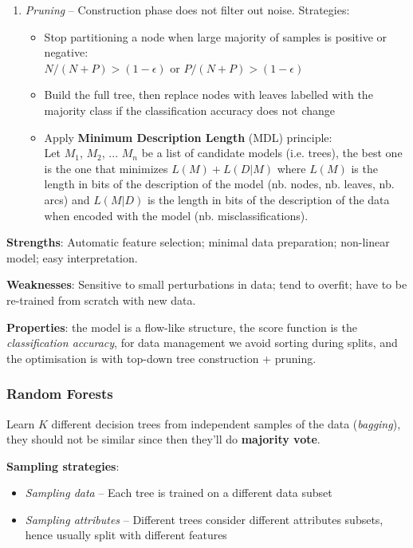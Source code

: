 \begin{enumerate}
      \item \emph{Pruning} -- Construction phase does not filter out noise. Strategies:
      \begin{itemize}
        \item Stop partitioning a node when large majority of samples is positive or negative:\\
        $N/(N+P)>(1-\epsilon)$ or $P/(N+P)>(1-\epsilon)$
        \item Build the full tree, then replace nodes with leaves labelled with the majority class if the classification accuracy does not change
        \item Apply \textbf{Minimum Description Length} (MDL) principle:\\
        Let $M_1$, $M_2$, ... $M_n$ be a list of candidate models (i.e. trees), the best one is the one that minimizes $L(M)+L(D|M)$ where $L(M)$ is the length in bits of the description of the model (nb. nodes, nb. leaves, nb. arcs) and $L(M|D)$ is the length in bits of the description of the data when encoded with the model (nb. misclassifications).
      \end{itemize}
    \end{enumerate}

    \textbf{Strengths}: Automatic feature selection; minimal data preparation; non-linear model; easy interpretation.

    \textbf{Weaknesses}: Sensitive to small perturbations in data; tend to overfit; have to be re-trained from scratch with new data.

    \textbf{Properties}: the model is a flow-like structure, the score function is the \emph{classification accuracy}, for data management we avoid sorting during splits, and the optimisation is with top-down tree construction + pruning.

  \subsubsection{Random Forests} %
  \label{ssub:random_forests}
    Learn $K$ different decision trees from independent samples of the data (\emph{bagging}), they should not be similar since then they'll do \textbf{majority vote}.

    \textbf{Sampling strategies}:
    \begin{itemize}
      \item \emph{Sampling data} -- Each tree is trained on a different data subset
      \item \emph{Sampling attributes} -- Different trees consider different attributes subsets, hence usually split with different features
    \end{itemize}

